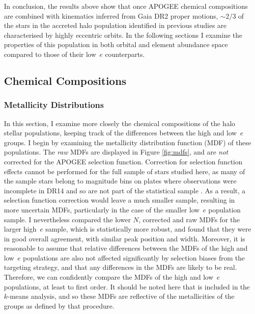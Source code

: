 In conclusion, the results above show that once APOGEE chemical
compositions are combined with kinematics inferred from Gaia DR2
proper motions, $\sim 2/3$ of the stars in the accreted halo
population identified in previous studies are characterised by
highly eccentric orbits.  In the following sections I examine
the properties of this population in both orbital and element
abundance space compared to those of their low~$e$ counterparts.

\subsection{Chemical Compositions}

\subsubsection{Metallicity Distributions} \label{sec:mdfs}

In this section, I examine more closely the chemical compositions
of the halo stellar populations, keeping track of the differences
between the high and low~$e$ groups. I begin by examining the
metallicity distribution function (MDF) of these populations.  The
{\it raw} MDFs are displayed in Figure \ref{fig:mdfs}, and are {\it
not} corrected for the APOGEE selection function. Correction for
selection function effects cannot be performed for the full sample
of stars studied here, as many of the sample stars belong to magnitude
bins on plates where observations were incomplete in DR14 and so
are not part of the statistical sample \citep[see][for details on
the selection function of APOGEE and the targeting strategy,
respectively]{2014ApJ...790..127B,2013AJ....146...81Z}. 
As a result, a selection function correction would leave a
much smaller sample, resulting in more uncertain MDFs, particularly
in the case of the smaller low~$e$ population sample.  I nevertheless
compared the lower $N$, corrected and raw MDFs for the larger
high~$e$ sample, which is statistically more robust, and found that
they were in good overall agreement, with similar peak position and
width.  Moreover, it
is reasonable to assume that relative differences between the MDFs
of the high and low~$e$ populations are also not affected significantly
by selection biases from the targeting strategy, and that any
differences in the MDFs are likely to be real. Therefore, we can
confidently compare the MDFs of the high and low~$e$ populations,
at least to first order.  It should be noted here that \feh{} is
included in the $k$-means analysis, and so these MDFs are reflective
of the metallicities of the groups as defined by that procedure.

